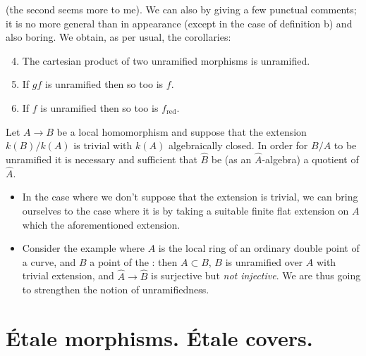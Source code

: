  (the second seems more  to me).
We can also \completelyunsure by giving a few punctual comments; it is no more general than in appearance (except in the case of definition b) and also boring.
We obtain, as per usual, the corollaries:

\begin{cor}
    \begin{enumerate}[\normalfont(i)]
        \setcounter{enumi}{3}
        \item The cartesian product of two unramified morphisms is unramified.
        \item If $gf$ is unramified then so too is $f$.
        \item If $f$ is unramified then so too is $f_\text{red}$.
    \end{enumerate}
\end{cor}

\begin{prop}
    Let $A\to B$ be a local homomorphism and suppose that the  extension $k(B)/k(A)$ is trivial with $k(A)$ algebraically closed.
    In order for $B/A$ to be unramified it is necessary and sufficient that $\hat{B}$ be (as an $\hat{A}$-algebra) a quotient of $\hat{A}$.
\end{prop}

\begin{rem}
    \begin{itemize}
        \item In the case where we don't suppose that the  extension is trivial, we can bring ourselves to the case where it is by taking a suitable finite flat extension on $A$ which  the aforementioned extension.
        \item Consider the example where $A$ is the local ring of an ordinary double point of a curve, and $B$ a point of the : then $A\subset B$, $B$ is unramified over $A$ with trivial  extension, and $\hat{A}\to\hat{B}$ is surjective but \emph{not injective}.
        We are thus going to strengthen the notion of unramifiedness.
    \end{itemize}
\end{rem}


\section{Étale morphisms. Étale covers.}
